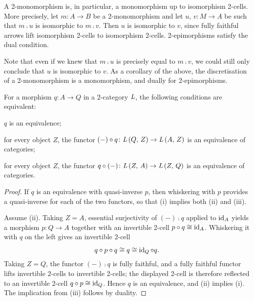 \begin{remark}
  \label{rem2monoismonouptoiso}
  A 2-monomorphism is, in particular, a monomorphism up to isomorphism 2-cells. More precisely, let \(m\colon A\to B\) be a 2-monomorphism and let \(u\), \(v\colon M\to A\) be such that \(m\comp u\) is isomorphic to \(m\comp v\). Then \(u\) is isomorphic to \(v\), since fully faithful arrows lift isomorphism 2-cells to isomorphism 2-cells. 2-epimorphisms satisfy the dual condition.

	Note that even if we knew that \(m\comp u\) is precisely equal to \(m\comp v\), we could still only conclude that \(u\) is isomorphic to \(v\). As a corollary of the above, the discretisation of a 2-monomorphism is a monomorphism, and dually for 2-epimorphisms.
\end{remark}

\begin{lemma}
  \label{L:RepEquiv}   \leanok
  For a morphism \(q\colon A\to Q\) in a 2-category \(\mathit{L}\), the following conditions are equivalent:
	\begin{tfae}
		\item \(q\) is an equivalence;
		\item for every object \(Z\), the functor \((-)\circ q\colon{\ensuremath{\mathit{L}}}\left({Q},\,{Z}\right)\to{\ensuremath{\mathit{L}}}\left({A},\,{Z}\right)\) is an equivalence of categories;
		\item for every object \(Z\), the functor \(q\circ(-)\colon{\ensuremath{\mathit{L}}}\left({Z},\,{A}\right)\to{\ensuremath{\mathit{L}}}\left({Z},\,{Q}\right)\) is an equivalence of categories.
	\end{tfae}
\end{lemma}

\begin{proof}
  
  \leanok
  If \(q\) is an equivalence with quasi-inverse \(p\), then whiskering with \(p\) provides a quasi-inverse for each of the two functors, so that (i) implies both (ii) and (iii).

	Assume (ii). Taking \(Z=A\), essential surjectivity of \((-)\comp q\) applied to \(\operatorname{id}_{A}\) yields a morphism \(p\colon Q\to A\) together with an invertible 2-cell \(p\circ q\cong\operatorname{id}_{A}\). Whiskering it with \(q\) on the left gives an invertible 2-cell
	\[
		q\circ p\circ q\cong q\cong\operatorname{id}_{Q}\circ q\text{.}
	\]
	Taking \(Z=Q\), the functor \((-)\comp q\) is fully faithful, and a fully faithful functor lifts invertible 2-cells to invertible 2-cells; the displayed 2-cell is therefore reflected to an invertible 2-cell \(q\circ p\cong\operatorname{id}_{Q}\). Hence \(q\) is an equivalence, and (ii) implies (i). The implication from (iii) follows by duality.
\end{proof}

